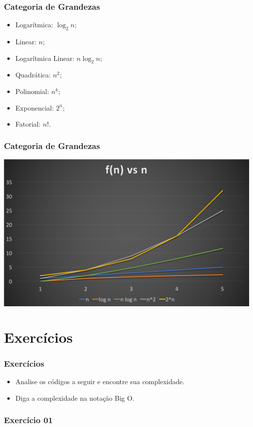 \documentclass{beamer}
\begin{document}
\begin{frame}
	\frametitle{Categoria de Grandezas}
    \begin{itemize}
        \item Logarítmica: $\log_2 n$;
        \item Linear: $n$;
        \item Logarítmica Linear: $n\log_2 n$;
        \item Quadrática: $n^2$;
        \item Polinomial: $n^k$;
        \item Exponencial: $2^n$;
        \item Fatorial: $n!$.
    \end{itemize}
\end{frame}

\begin{frame}
    \frametitle{Categoria de Grandezas}
    \includegraphics[width=\textwidth]{images/grafico_funcoes.png}
\end{frame}


\section{Exercícios}

\begin{frame}
    \frametitle{Exercícios}
    \begin{itemize}
        \item Analise os códigos a seguir e encontre sua complexidade.
        \item Diga a complexidade na notação Big O.
    \end{itemize}
\end{frame}

\begin{frame}
	\frametitle{Exercício 01}
    
\end{frame}
\end{document}

